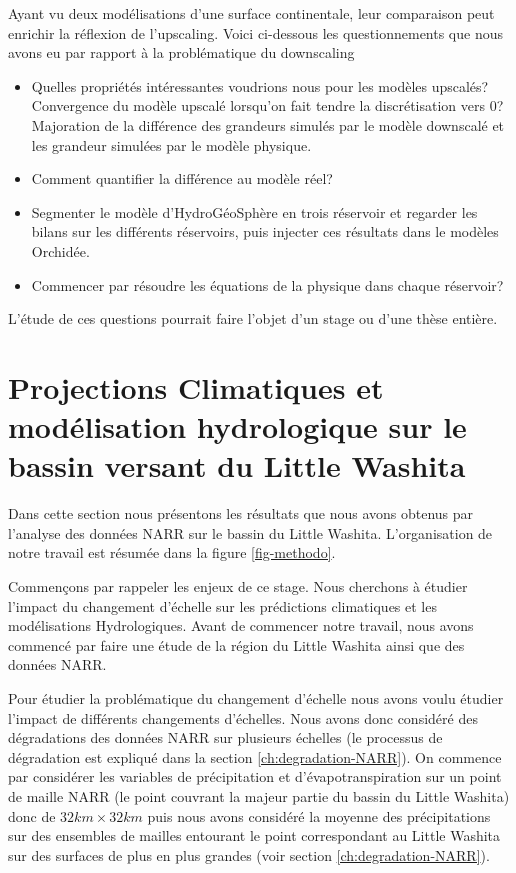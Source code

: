\documentclass[a4paper,11pt]{article}
\numberwithin{equation}{section}
\begin{document}
Ayant vu deux modélisations d'une surface continentale, leur comparaison peut enrichir la réflexion de l'upscaling. Voici ci-dessous les questionnements que nous avons eu par rapport à la problématique du downscaling

\begin{itemize}
	\item Quelles propriétés intéressantes voudrions nous pour les modèles upscalés? 
	\subitem Convergence du modèle upscalé lorsqu'on fait tendre la discrétisation vers $0$? 
	\subitem Majoration de la différence des grandeurs simulés par le modèle downscalé et les grandeur simulées par le modèle physique.   
	\item Comment quantifier la différence au modèle réel?
	\item Segmenter le modèle d'HydroGéoSphère en trois réservoir et regarder les bilans sur les différents réservoirs, puis injecter ces résultats dans le modèles Orchidée.
	\item Commencer par résoudre les équations de la physique dans chaque réservoir?
\end{itemize}

L'étude de ces questions pourrait faire l'objet d'un stage ou d'une thèse entière. 

\newpage
\section{Projections Climatiques et modélisation hydrologique sur le bassin versant du Little Washita}

\label{ch:proj-climatique-mod-hydro}

Dans cette section nous présentons les résultats que nous avons obtenus par l'analyse des données NARR sur le bassin du Little Washita. L'organisation de notre travail est résumée dans la figure \ref{fig-methodo}.

Commençons par rappeler les enjeux de ce stage. Nous cherchons à étudier l'impact du changement d'échelle sur les prédictions climatiques et les modélisations Hydrologiques. Avant de commencer notre travail, nous avons commencé par faire une étude de la région du Little Washita ainsi que des données NARR.

Pour étudier la problématique du changement d'échelle nous avons voulu étudier l'impact de différents changements d'échelles. Nous avons donc considéré des dégradations des données NARR sur plusieurs échelles (le processus de dégradation est expliqué dans la section \ref{ch:degradation-NARR}). On commence par considérer les variables de précipitation et d'évapotranspiration sur un point de maille NARR (le point couvrant la majeur partie du bassin du Little Washita) donc de $32km\times 32km$ puis nous avons considéré la moyenne des précipitations sur des ensembles de mailles entourant le point correspondant au Little Washita sur des surfaces de plus en plus grandes (voir section \ref{ch:degradation-NARR}).
\end{document}
